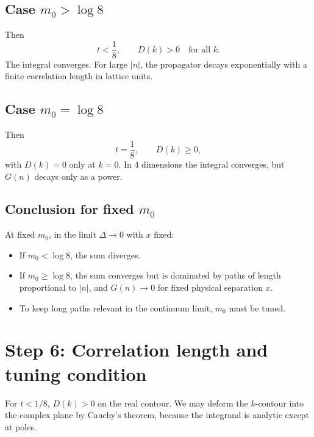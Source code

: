 \documentclass[12pt]{article}
\begin{document}
\subsection{Case \(m_0>\log 8\)}
Then
\[
t<\frac18,
\qquad
D(k)>0\quad\text{for all }k.
\]
The integral converges.  
For large \(|n|\), the propagator decays exponentially with a finite correlation length in lattice units.

\subsection{Case \(m_0=\log 8\)}
Then
\[
t=\frac18,
\qquad
D(k)\ge 0,
\]
with \(D(k)=0\) only at \(k=0\).  
In \(4\) dimensions the integral converges, but \(G(n)\) decays only as a power.

\subsection{Conclusion for fixed \(m_0\)}
At fixed \(m_0\), in the limit \(\Delta\to 0\) with \(x\) fixed:
\begin{itemize}
    \item If \(m_0<\log 8\), the sum diverges.
    \item If \(m_0\ge \log 8\), the sum converges but is dominated by paths of length proportional to \(|n|\), and \(G(n)\to 0\) for fixed physical separation \(x\).
    \item To keep long paths relevant in the continuum limit, \(m_0\) must be tuned.
\end{itemize}

\section{Step 6: Correlation length and tuning condition}

For \(t<1/8\), \(D(k)>0\) on the real contour.  
We may deform the \(k\)-contour into the complex plane by Cauchy's theorem, because the integrand is analytic except at poles.
\end{document}
